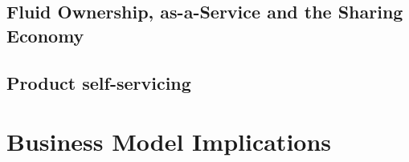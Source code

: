 \subsection{Fluid Ownership, as-a-Service and the Sharing Economy}

\subsection{}

\subsection{Product self-servicing}


\section{Business Model Implications}













